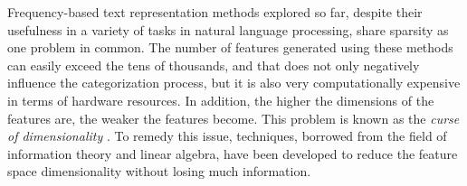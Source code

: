 Frequency-based text representation methods explored so far, despite their usefulness in a variety of tasks in natural language processing, share sparsity as one problem in common. The number of features generated using these methods can easily exceed the tens of thousands, and that does not only negatively influence the categorization process, but it is also very computationally expensive in terms of hardware resources. In addition, the higher the dimensions of the features are, the weaker the features become. This problem is known as the \emph{curse of dimensionality} \citep{bellman2015adaptive}. To remedy this issue,  techniques, borrowed from the field of information theory and linear algebra, have been developed to reduce the feature space dimensionality without losing much information. 



